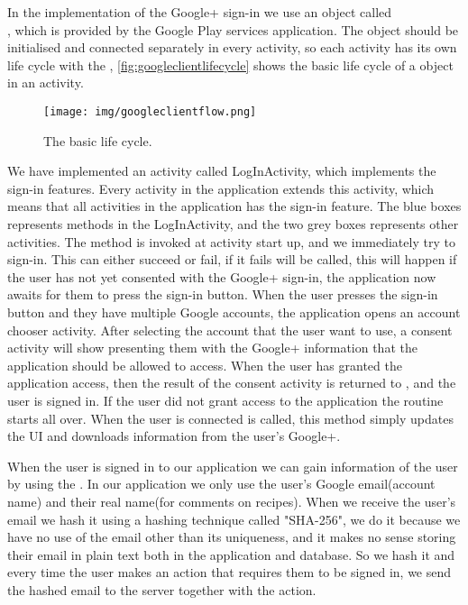 In the implementation of the Google+ sign-in we use an object called \\\citep{googleapiclient-docs}, which is provided by the Google Play services application. 
The object  should be initialised and connected separately in every activity, so each activity has its own life cycle with the , \autoref{fig:googleclientlifecycle} shows the basic life cycle of a  object in an activity.
\begin{figure}[H]
\centering
\texttt{[image: img/googleclientflow.png]}
\caption{The  basic life cycle.\cite{googleapiclient-lifecycle}}
\label{fig:googleclientlifecycle}
\end{figure}
We have implemented an activity called LogInActivity, which implements the sign-in features. Every activity in the application extends this activity, which means that all activities in the application has the sign-in feature. 
The blue boxes represents methods in the LogInActivity, and the two grey boxes represents other activities. The method  is invoked at activity start up, and we immediately try to sign-in. 
This can either succeed or fail, if it fails  will be called, this will happen if the user has not yet consented with the Google+ sign-in, the application now awaits for them to press the sign-in button. 
When the user presses the sign-in button and they have multiple Google accounts, the application opens an account chooser activity.
After selecting the account that the user want to use, a consent activity will show presenting them with the Google+ information that the application should be allowed to access. 
When the user has granted the application access, then the result of the consent activity is returned to , and the user is signed in. 
If the user did not grant access to the application the routine starts all over. When the user is connected  is called, this method simply updates the UI and downloads information from the user's Google+.

When the user is signed in to our application we can gain information of the user by using the .
In our application we only use the user's Google email(account name) and their real name(for comments on recipes). 
When we receive the user's email we hash it using a hashing technique called "SHA-256", we do it because we have no use of the email other than its uniqueness, and it makes no sense storing their email in plain text both in the application and database. 
So we hash it and every time the user makes an action that requires them to be signed in, we send the hashed email to the server together with the action. 



